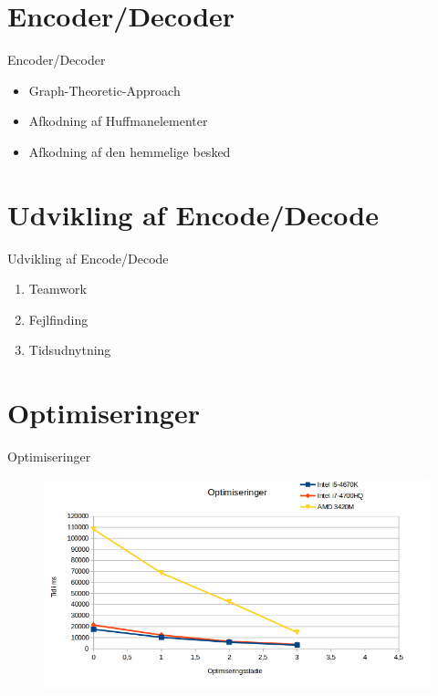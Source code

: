 \section{Encoder/Decoder}
\begin{frame}{Encoder/Decoder}{}
	\begin{itemize}
		\item Graph-Theoretic-Approach
		\item Afkodning af Huffmanelementer
		\item Afkodning af den hemmelige besked
	\end{itemize}
\end{frame}


\section{Udvikling af Encode/Decode}
\begin{frame}{Udvikling af Encode/Decode}{}
	\begin{enumerate}
		\item Teamwork
		\item Fejlfinding
		\item Tidsudnytning
	\end{enumerate}
\end{frame}


\section{Optimiseringer}
\begin{frame}{Optimiseringer}{}
		\begin{figure}[!H]
			\centering
			\includegraphics[width=1\textwidth]{./Jacob/Selection_744.png}
	\end{figure}
\end{frame}